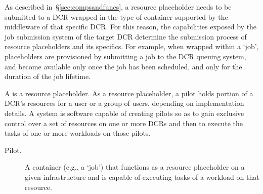 \documentclass{sig-alternate}
\begin{document}
As described in~\S\ref{sec:compsandfuncs}, a resource placeholder needs to be
submitted to a DCR wrapped in the type of container supported by the middleware
of that specific DCR. For this reason, the capabilities exposed by the job
submission system of the target DCR determine the submission process of resource
placeholders and its specifics.  For example, when wrapped within a `job',
placeholders are provisioned by submitting a job to the DCR queuing system, and
become available only once the job has been scheduled, and only for the duration
of the job lifetime.




A \pilot is a resource placeholder. As a resource placeholder, a pilot holds
portion of a DCR's resources for a user or a group of users, depending on
implementation details. A \pilotjob system is software capable of creating
pilots so as to gain exclusive control over a set of resources on one or more
DCRs and then to execute the tasks of one or more workloads on those pilots.




\begin{description}

\item[Pilot.] A container (e.g., a `job') that functions as a resource
placeholder on a given infrastructure and is capable of executing tasks of a
workload on that resource.

\end{description}
\end{document}
